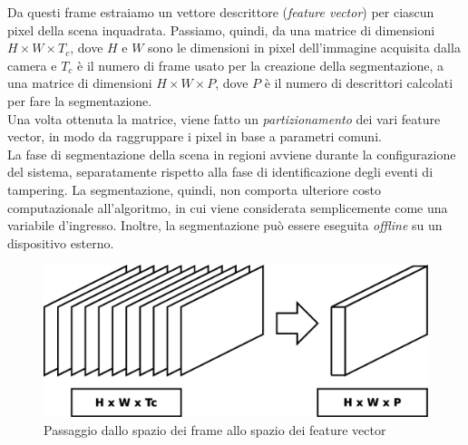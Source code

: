 Da questi frame estraiamo un vettore descrittore (\textit{feature vector}) per ciascun pixel della scena inquadrata.
Passiamo, quindi, da una matrice di dimensioni $H\times W \times T_{c}$, dove $H$ e $W$ sono le dimensioni in pixel dell'immagine acquisita dalla camera e $T_{c}$ \`e il numero di frame usato per la creazione della segmentazione, a una matrice di dimensioni $H\times W \times P$, dove $P$ \`e il numero di descrittori calcolati per fare la segmentazione.\\
Una volta ottenuta la matrice, viene fatto un \textit{partizionamento} dei vari feature vector, in modo da raggruppare i pixel in base a parametri comuni.\\
La fase di segmentazione della scena in regioni avviene durante la configurazione del sistema, separatamente rispetto alla fase di identificazione degli eventi di tampering.
La segmentazione, quindi, non comporta ulteriore costo computazionale all'algoritmo, in cui viene considerata semplicemente come una variabile d'ingresso.
Inoltre, la segmentazione pu\`o essere eseguita \textit{offline} su un dispositivo esterno.
\begin{figure}
	\centering
	\includegraphics[width=0.7\linewidth]{diagrammi/FeatureVector}
	\caption{Passaggio dallo spazio dei frame allo spazio dei feature vector}
	\label{fig:FeatureVector}
\end{figure}

